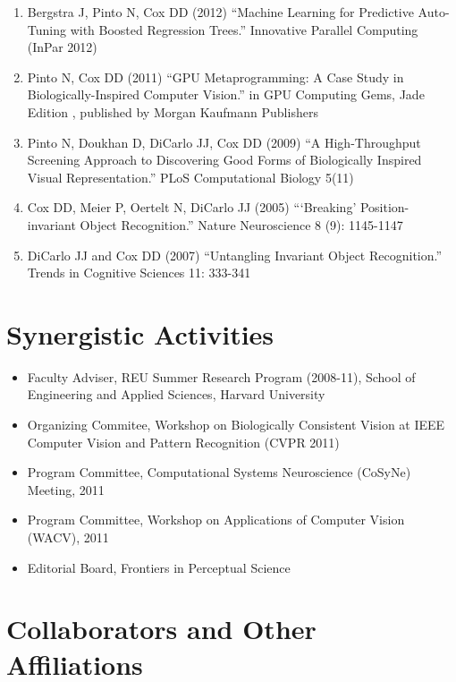 \documentclass{nsfproposal}
\begin{document}
\begin{enumerate}

\item Bergstra J, Pinto N, Cox DD (2012)
``Machine Learning for Predictive Auto-Tuning with Boosted Regression Trees.''
Innovative Parallel Computing (InPar 2012)

\item Pinto N, Cox DD (2011)
``GPU Metaprogramming: A Case Study in Biologically-Inspired Computer Vision.''
in GPU Computing Gems, Jade Edition , published by Morgan Kaufmann Publishers

\item Pinto N, Doukhan D, DiCarlo JJ, Cox DD (2009)
``A High-Throughput Screening Approach to Discovering Good Forms of Biologically Inspired Visual Representation.''
PLoS Computational Biology 5(11)

\item Cox DD, Meier P, Oertelt N, DiCarlo JJ (2005)
```Breaking' Position-invariant Object Recognition.''
Nature Neuroscience 8 (9): 1145-1147

\item DiCarlo JJ and Cox DD (2007)
``Untangling Invariant Object Recognition.''
Trends in Cognitive Sciences 11: 333-341

\end{enumerate}

\section{Synergistic Activities}

\begin{itemize}
\item Faculty Adviser, REU Summer Research Program (2008-11), School of Engineering and Applied Sciences, Harvard University
\item Organizing Commitee, Workshop on Biologically Consistent Vision at IEEE Computer Vision and Pattern Recognition (CVPR 2011)
\item Program Committee, Computational Systems Neuroscience (CoSyNe) Meeting, 2011
\item Program Committee, Workshop on Applications of Computer Vision (WACV), 2011
\item Editorial Board, Frontiers in Perceptual Science
\end{itemize}

\section{Collaborators and Other Affiliations}
\end{document}
